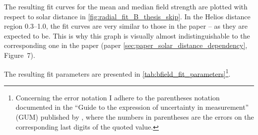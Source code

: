 The resulting fit curves for the mean and median field strength are plotted with respect to solar distance in \autoref{fig:radial_fit_B_thesis_skip}. In the Helios distance region \SIrange{0.3}{1.0}{\au}, the fit curves are very similar to those in the paper -- as they are expected to be. This is why this graph is visually almost indistinguishable to the corresponding one in the paper (paper \autoref{sec:paper_solar_distance_dependency}, Figure~7).
\begin{figure}[htb]
\end{figure}
The resulting fit parameters are presented in \autoref{tab:bfield_fit_parameters}\footnote{
Concerning the error notation I adhere to the parentheses notation documented in the ``Guide to the expression of uncertainty in measurement'' (GUM) published by \citet{GUM2008}, where the numbers in parentheses are the errors on the corresponding last digits of the quoted value.
}.
